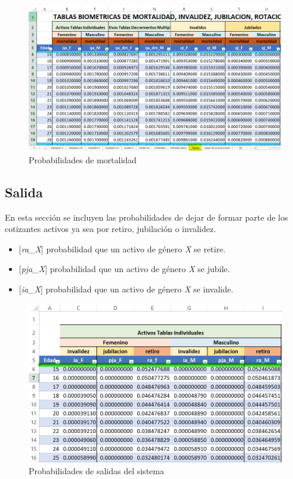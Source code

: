 \documentclass[
  letterpaper,
  DIV=11,
  numbers=noendperiod]{scrreprt}
\providecommand{\tightlist}{%
  \setlength{\itemsep}{0pt}\setlength{\parskip}{0pt}}\usepackage{longtable,booktabs,array}
\begin{document}
\begin{figure}

{\centering \includegraphics{images/F/Img3.png}

}

\caption{Probabilidades de mortalidad}

\end{figure}

\hypertarget{salida}{%
\subsection{Salida}\label{salida}}

En esta sección se incluyen las probabilidades de dejar de formar parte
de los cotizantes activos ya sea por retiro, jubilación o invalidez.

\begin{itemize}
\tightlist
\item
  {[}\emph{ra\_X}{]} probabilidad que un activo de género \emph{X} se
  retire.
\item
  {[}\emph{pja\_X}{]} probabilidad que un activo de género \emph{X} se
  jubile.
\item
  {[}\emph{ia\_X}{]} probabilidad que un activo de género \emph{X} se
  invalide.
\end{itemize}

\begin{figure}

{\centering \includegraphics[width=5.65625in,height=\textheight]{images/F/Img4.png}

}

\caption{Probabilidades de salidas del sistema}

\end{figure}
\end{document}

